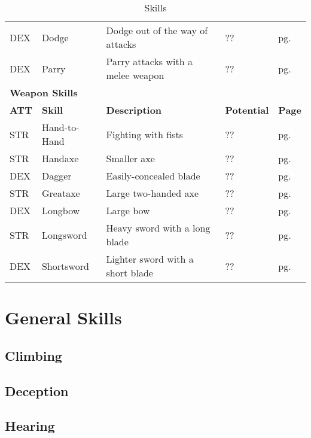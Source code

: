 \begin{multicols*}{2}
\begin{table*}[ht]
\begin{tabularx}{\textwidth}{l l X l l}
            DEX & Dodge & Dodge out of the way of attacks & ?? & pg. \pageref{skill:dodge} \\
            DEX & Parry & Parry attacks with a melee weapon & ?? & pg. \pageref{skill:parry} \\
            \multicolumn{5}{l}{\bfseries{Weapon Skills}} \\
            \bfseries{ATT} & \bfseries{Skill} & \bfseries{Description} & \bfseries{Potential} & \bfseries{Page} \\
            STR & Hand-to-Hand & Fighting with fists & ?? & pg. \pageref{skill:hand-to-hand} \\
            STR & Handaxe & Smaller axe & ?? & pg. \pageref{skill:handaxe} \\
            DEX & Dagger & Easily-concealed blade & ?? & pg. \pageref{skill:dagger} \\
            STR & Greataxe & Large two-handed axe & ?? & pg. \pageref{skill:greataxe} \\
            DEX & Longbow & Large bow & ?? & pg. \pageref{skill:longbow} \\
            STR & Longsword & Heavy sword with a long blade & ?? & pg. \pageref{skill:longsword} \\
            DEX & Shortsword & Lighter sword with a short blade & ?? & pg. \pageref{skill:shortsword} \\
        \end{tabularx}
        \caption{Skills}
        \label{tab:skills}
    \end{table*}
    \Blindtext\Blindtext\Blindtext\Blindtext
\end{multicols*}

\section{General Skills}

\subsection{Climbing}\label{skill:climbing}

\subsection{Deception}\label{skill:deception}

\subsection{Hearing}\label{skill:hearing}

